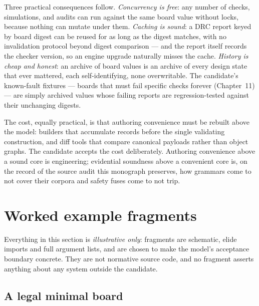 Three practical consequences follow. \emph{Concurrency is free}: any
number of checks, simulations, and audits can run against the same
board value without locks, because nothing can mutate under them.
\emph{Caching is sound}: a DRC report keyed by board digest can be
reused for as long as the digest matches, with no invalidation
protocol beyond digest comparison --- and the report itself records the
checker version, so an engine upgrade naturally misses the cache.
\emph{History is cheap and honest}: an archive of board values is an
archive of every design state that ever mattered, each
self-identifying, none overwritable. The candidate's known-fault
fixtures --- boards that must fail specific checks forever
(Chapter~11) --- are simply archived values whose failing reports are
regression-tested against their unchanging digests.

The cost, equally practical, is that authoring convenience must be
rebuilt above the model: builders that accumulate records before the
single validating construction, and diff tools that compare canonical
payloads rather than object graphs. The candidate accepts the cost
deliberately. Authoring convenience above a sound core is engineering;
evidential soundness above a convenient core is, on the record of the
source audit this monograph preserves, how grammars come to not cover
their corpora and safety fuses come to not trip.

\section{Worked example fragments}\label{ch05:sec:worked}

Everything in this section is \emph{illustrative only}: fragments are
schematic, elide imports and full argument lists, and are chosen to make
the model's acceptance boundary concrete. They are not normative source
code, and no fragment asserts anything about any system outside the
candidate.

\subsection{A legal minimal board}\label{ch05:sec:legalboard}

